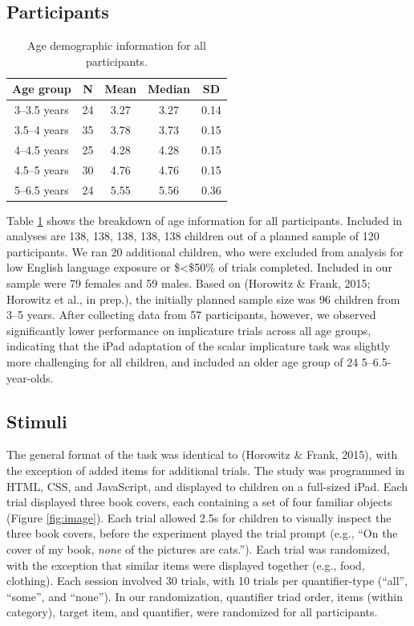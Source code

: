 \documentclass[10pt, letterpaper]{article}
\begin{document}
\subsection{Participants}\label{participants}

\begin{table}[ht]
\centering
\begin{tabular}{c c c c c } 
 \hline
 Age group & N & Mean & Median & SD \\
 \hline
 3--3.5 years & 24 & 3.27 & 3.27 & 0.14\\
 \hline
 3.5--4 years & 35 & 3.78 & 3.73 & 0.15 \\ 
 \hline
 4--4.5 years & 25 & 4.28 & 4.28 & 0.15\\
 \hline
 4.5--5 years & 30 & 4.76 & 4.76 & 0.15 \\
 \hline
 5--6.5 years & 24 & 5.55 & 5.56 & 0.36 \\
 \hline
\end{tabular}
\caption{Age demographic information for all participants.}
\label{tab:age}
\end{table}

Table \ref{tab:age} shows the breakdown of age information for all
participants. Included in analyses are 138, 138, 138, 138, 138 children
out of a planned sample of 120 participants. We ran 20 additional
children, who were excluded from analysis for low English language
exposure or \$\textless{}\$50\% of trials completed. Included in our
sample were 79 females and 59 males. Based on (Horowitz \& Frank, 2015;
Horowitz et al., in prep.), the initially planned sample size was 96
children from 3--5 years. After collecting data from 57 participants,
however, we observed significantly lower performance on implicature
trials across all age groups, indicating that the iPad adaptation of the
scalar implicature task was slightly more challenging for all children,
and included an older age group of 24 5--6.5-year-olds.

\subsection{Stimuli}\label{stimuli}

The general format of the task was identical to (Horowitz \& Frank,
2015), with the exception of added items for additional trials. The
study was programmed in HTML, CSS, and JavaScript, and displayed to
children on a full-sized iPad. Each trial displayed three book covers,
each containing a set of four familiar objects (Figure \ref{fig:image}).
Each trial allowed 2.5s for children to visually inspect the three book
covers, before the experiment played the trial prompt (e.g., ``On the
cover of my book, \emph{none} of the pictures are cats.''). Each trial
was randomized, with the exception that similar items were displayed
together (e.g., food, clothing). Each session involved 30 trials, with
10 trials per quantifier-type (``all'', ``some'', and ``none''). In our
randomization, quantifier triad order, items (within category), target
item, and quantifier, were randomized for all participants.
\end{document}
